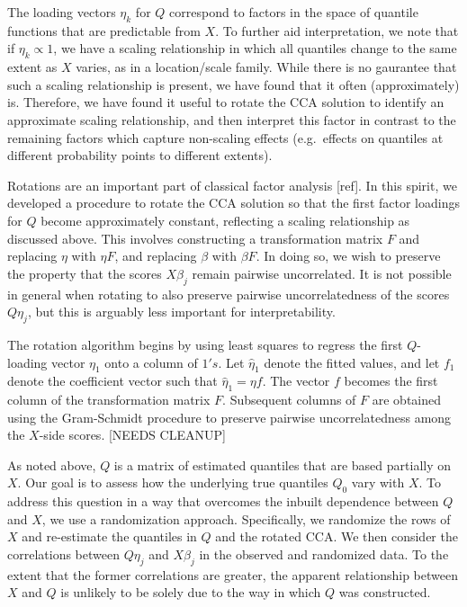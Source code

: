 The loading vectors $\eta_k$ for $Q$ correspond to factors in the
space of quantile functions that are predictable from $X$.  To further
aid interpretation, we note that if $\eta_k \propto 1$, we have a
scaling relationship in which all quantiles change to the same extent
as $X$ varies, as in a location/scale family.  While there is no
gaurantee that such a scaling relationship is present, we have found
that it often (approximately) is.  Therefore, we have found it useful
to rotate the CCA solution to identify an approximate scaling
relationship, and then interpret this factor in contrast to the
remaining factors which capture non-scaling effects (e.g.\ effects on
quantiles at different probability points to different extents).

Rotations are an important part of classical factor analysis [ref].
In this spirit, we developed a procedure to rotate the CCA solution so
that the first factor loadings for $Q$ become approximately constant,
reflecting a scaling relationship as discussed above.  This involves
constructing a transformation matrix $F$ and replacing $\eta$ with
$\eta F$, and replacing $\beta$ with $\beta F$.  In doing so, we wish
to preserve the property that the scores $X\beta_j$ remain pairwise
uncorrelated.  It is not possible in general when rotating to also
preserve pairwise uncorrelatedness of the scores $Q\eta_j$, but this
is arguably less important for interpretability.

The rotation algorithm begins by using least squares to regress the
first $Q$-loading vector $\eta_1$ onto a column of $1's$.  Let
$\hat{\eta}_1$ denote the fitted values, and let $f_1$ denote the
coefficient vector such that $\hat{\eta}_1 = \eta f$. The vector $f$
becomes the first column of the transformation matrix $F$.  Subsequent
columns of $F$ are obtained using the Gram-Schmidt procedure to
preserve pairwise uncorrelatedness among the $X$-side scores. [NEEDS
CLEANUP]

As noted above, $Q$ is a matrix of estimated quantiles that are based
partially on $X$.  Our goal is to assess how the underlying true
quantiles $Q_0$ vary with $X$.  To address this question in a way that
overcomes the inbuilt dependence between $Q$ and $X$, we use a
randomization approach.  Specifically, we randomize the rows of $X$
and re-estimate the quantiles in $Q$ and the rotated CCA.  We then
consider the correlations between $Q\eta_j$ and $X\beta_j$ in the
observed and randomized data.  To the extent that the former
correlations are greater, the apparent relationship between $X$ and
$Q$ is unlikely to be solely due to the way in which $Q$ was
constructed.

